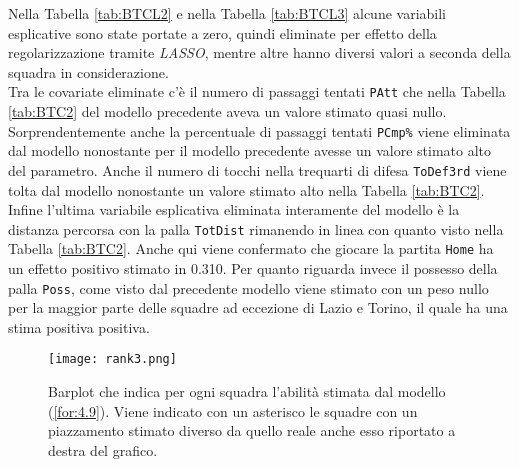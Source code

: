 Nella Tabella \ref{tab:BTCL2} e nella Tabella \ref{tab:BTCL3} alcune variabili esplicative sono state portate a zero, quindi eliminate per effetto della regolarizzazione tramite \emph{LASSO}, mentre altre hanno diversi valori a seconda della squadra in considerazione. \\
Tra le covariate eliminate c'è il numero di passaggi tentati \texttt{PAtt} che nella Tabella \ref{tab:BTC2} del modello precedente aveva un valore stimato quasi nullo. Sorprendentemente anche la percentuale di passaggi tentati \texttt{PCmp\%} viene eliminata dal modello nonostante per il modello precedente avesse un valore stimato alto del parametro. Anche il numero di tocchi nella trequarti di difesa \texttt{ToDef3rd} viene tolta dal modello nonostante un valore stimato alto nella Tabella \ref{tab:BTC2}. Infine l'ultima variabile esplicativa eliminata interamente del modello è la distanza percorsa con la palla \texttt{TotDist} rimanendo in linea con quanto visto nella Tabella \ref{tab:BTC2}.
Anche qui viene confermato che giocare la partita \texttt{Home} ha un effetto positivo stimato in 0.310. Per quanto riguarda invece il possesso della palla \texttt{Poss}, come visto dal precedente modello viene stimato con un peso nullo per la maggior parte delle squadre ad eccezione di Lazio e Torino, il quale ha una stima positiva positiva.

\begin{sidewaysfigure} 
	\centering
	\begin{center}
		\texttt{[image: rank3.png]}
		\caption{Barplot che indica per ogni squadra l'abilità stimata dal modello (\ref{for:4.9}). Viene indicato con un asterisco le squadre con un piazzamento stimato diverso da quello reale anche esso riportato a destra del grafico.} \label{tab:BTCL} 
	\end{center}
\end{sidewaysfigure}

